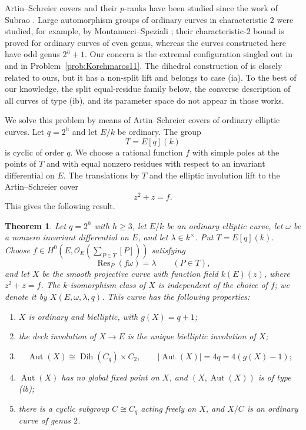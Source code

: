 \documentclass[11pt]{article}
\newtheorem{theorem}{Theorem}[section]
\theoremstyle{remark}
\newcommand{\Aut}{\operatorname{Aut}}
\newcommand{\Res}{\operatorname{Res}}
\newcommand{\Dih}{\operatorname{Dih}}
\begin{document}
Artin--Schreier covers and their $p$-ranks have been studied since the
work of Subrao \cite{Subrao}.  Large automorphism groups of ordinary
curves in characteristic $2$ were studied, for example, by
Montanucci--Speziali \cite{MontanucciSpeziali}; their characteristic-$2$
bound is proved for ordinary curves of even genus, whereas the curves
constructed here have odd genus $2^h+1$.  Our concern is the extremal
configuration singled out in \cite{GK2015} and in
Problem~\ref{prob:Korchmaros11}.  The dihedral construction of
\cite[Section~5]{GK2015} is closely related to ours, but it has a non-split
lift and belongs to case \textup{(ia)}.  To the best of our knowledge, the
split equal-residue family below, the converse description of all curves of
type \textup{(ib)}, and its parameter space do not appear in those works.

We solve this problem by means of Artin--Schreier covers of ordinary
elliptic curves.  Let $q=2^h$ and let $E/k$ be ordinary.  The group
\[
        T=E[q](k)
\]
is cyclic of order $q$.  We choose a rational function $f$ with simple
poles at the points of $T$ and with equal nonzero residues with respect
to an invariant differential on $E$.  The translations by $T$ and the
elliptic involution lift to the Artin--Schreier cover
\[
        z^2+z=f.
\]
This gives the following result.

\begin{theorem}\label{thm:main}
Let $q=2^h$ with $h\ge3$, let $E/k$ be an ordinary elliptic curve, let
$\omega$ be a nonzero invariant differential on $E$, and let
$\lambda\in k^\times$.  Put $T=E[q](k)$.  Choose
$f\in H^0(E,\mathcal O_E(\sum_{P\in T}[P]))$ satisfying
\[
        \Res_P(f\omega)=\lambda\qquad(P\in T),
\]
and let $X$ be the smooth projective curve with function field
$k(E)(z)$, where $z^2+z=f$.  The $k$-isomorphism class of $X$ is
independent of the choice of $f$; we denote it by
$X(E,\omega,\lambda,q)$.  This curve has the following properties:
\begin{enumerate}[label=\textup{(\roman*)}]
\item $X$ is ordinary and bielliptic, with $g(X)=q+1$;
\item the deck involution of $X\to E$ is the unique bielliptic
involution of $X$;
\item
\[
        \Aut(X)\cong \Dih(C_q)\times C_2,
        \qquad
        |\Aut(X)|=4q=4(g(X)-1);
\]
\item $\Aut(X)$ has no global fixed point on $X$, and
$(X,\Aut(X))$ is of type \textup{(ib)};
\item there is a cyclic subgroup $C\cong C_q$ acting freely on $X$, and
$X/C$ is an ordinary curve of genus $2$.
\end{enumerate}
\end{theorem}
\end{document}

